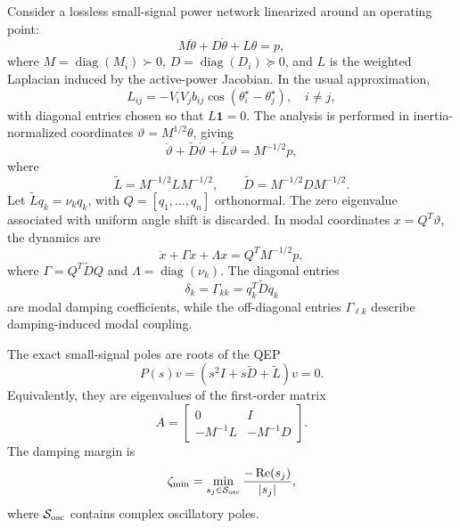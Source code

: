 \documentclass[journal]{IEEEtran}
\newcommand{\Lt}{\widetilde L}
\newcommand{\Dt}{\widetilde D}
\newcommand{\diag}{\operatorname{diag}}
\newcommand{\Real}{\operatorname{Re}}
\begin{document}
Consider a lossless small-signal power network linearized around an operating point:
\begin{equation}
M\ddot{\theta}+D\dot{\theta}+L\theta=p,
\label{eq:swing}
\end{equation}
where $M=\diag(M_i)\succ0$, $D=\diag(D_i)\succeq0$, and $L$ is the weighted Laplacian induced by the active-power Jacobian. In the usual approximation,
\begin{equation}
L_{ij}=-V_iV_jb_{ij}\cos(\theta_i^\star-\theta_j^\star),\quad i\neq j,
\end{equation}
with diagonal entries chosen so that $L\mathbf{1}=0$. The analysis is performed in inertia-normalized coordinates $\vartheta=M^{1/2}\theta$, giving
\begin{equation}
\ddot{\vartheta}+\Dt\dot{\vartheta}+\Lt\vartheta=M^{-1/2}p,
\label{eq:normalized}
\end{equation}
where
\begin{equation}
\Lt=M^{-1/2}LM^{-1/2},\qquad \Dt=M^{-1/2}DM^{-1/2}.
\end{equation}
Let $\Lt q_k=\nu_kq_k$, with $Q=[q_1,\ldots,q_n]$ orthonormal. The zero eigenvalue associated with uniform angle shift is discarded. In modal coordinates $x=Q^T\vartheta$, the dynamics are
\begin{equation}
\ddot{x}+\Gamma\dot{x}+\Lambda x=Q^TM^{-1/2}p,
\label{eq:modal}
\end{equation}
where $\Gamma=Q^T\Dt Q$ and $\Lambda=\diag(\nu_k)$. The diagonal entries
\begin{equation}
\delta_k=\Gamma_{kk}=q_k^T\Dt q_k
\end{equation}
are modal damping coefficients, while the off-diagonal entries $\Gamma_{\ell k}$ describe damping-induced modal coupling.

The exact small-signal poles are roots of the QEP
\begin{equation}
P(s)v=(s^2I+s\Dt+\Lt)v=0.
\label{eq:qep}
\end{equation}
Equivalently, they are eigenvalues of the first-order matrix
\begin{equation}
A=\begin{bmatrix}
0&I\\
-M^{-1}L&-M^{-1}D
\end{bmatrix}.
\end{equation}
The damping margin is
\begin{equation}
\zeta_{\min}=\min_{s_j\in\mathcal{S}_{\rm osc}}\frac{-\Real(s_j)}{|s_j|},
\label{eq:zeta}
\end{equation}
where $\mathcal{S}_{\rm osc}$ contains complex oscillatory poles.
\end{document}
